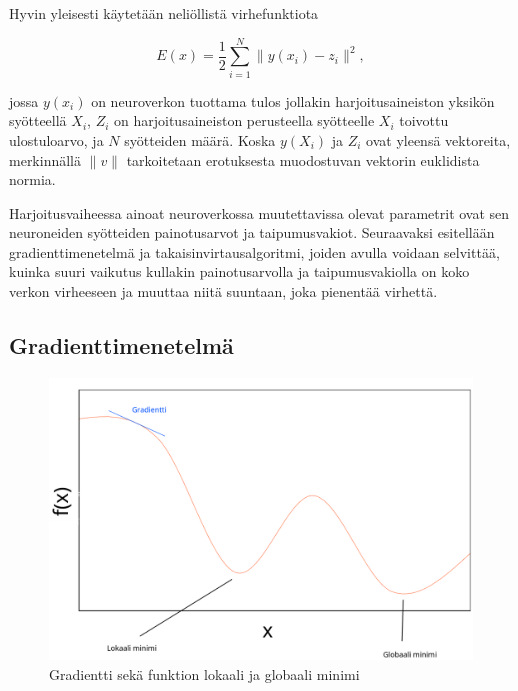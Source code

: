 \documentclass[finnish]{tktltiki2}
\theoremstyle{definition}
\theoremstyle{remark}
\begin{document}
   Hyvin yleisesti käytetään neliöllistä virhefunktiota

  \begin{equation}
    E(x) = \frac{1}{2} \sum_{i=1}^{N} \| y(x_i) - z_i \|^2,
    \label{eq:error-function}
  \end{equation}

  jossa $y(x_i)$ on neuroverkon tuottama tulos jollakin harjoitusaineiston yksikön syötteellä $X_i$, $Z_i$ on harjoitusaineiston perusteella syötteelle $X_i$ toivottu ulostuloarvo, ja $N$ syötteiden määrä. Koska $y(X_i)$ ja $Z_i$ ovat yleensä vektoreita, merkinnällä $\|v\|$ tarkoitetaan erotuksesta muodostuvan vektorin euklidista normia.

  Harjoitusvaiheessa ainoat neuroverkossa muutettavissa olevat parametrit ovat sen neuroneiden syötteiden painotusarvot ja taipumusvakiot. Seuraavaksi esitellään gradienttimenetelmä ja takaisinvirtausalgoritmi, joiden avulla voidaan selvittää, kuinka suuri vaikutus kullakin painotusarvolla ja taipumusvakiolla on koko verkon virheeseen ja muuttaa niitä suuntaan, joka pienentää virhettä.



  \subsection{Gradienttimenetelmä}
    \label{chap:backprop}

    \begin{figure}[h]
      \centering
      \includegraphics[scale=0.4]{gradient-descent}
      \caption{Gradientti sekä funktion lokaali ja globaali minimi}
      \label{pic:composition}
    \end{figure}
\end{document}
